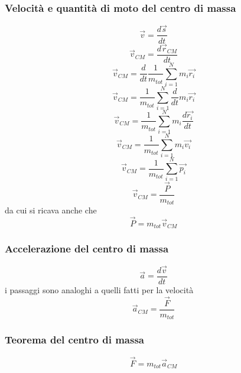 \documentclass[twoside]{article}
\begin{document}
\subsubsection{Velocità e quantità di moto del centro di massa}
\begin{equation*}
  \vec{v} = \frac{d \vec{s}}{dt}
\end{equation*}
\begin{equation*}
  \vec{v}_{CM} = \frac{d \vec{r}_{CM}}{dt}
\end{equation*}
\begin{equation*}
  \vec{v}_{CM} = \frac{d}{dt} \frac{1}{m_{tot}} \sum_{i=1}^{N} m_i \vec{r_i}
\end{equation*}
\begin{equation*}
  \vec{v}_{CM} = \frac{1}{m_{tot}} \sum_{i=1}^{N} \frac{d}{dt}m_i \vec{r_i}
\end{equation*}
\begin{equation*}
  \vec{v}_{CM} = \frac{1}{m_{tot}} \sum_{i=1}^{N} m_i \frac{d\vec{r_i}}{dt}
\end{equation*}
\begin{equation*}
  \vec{v}_{CM} = \frac{1}{m_{tot}} \sum_{i=1}^{N} m_i \vec{v_i}
\end{equation*}
\begin{equation*}
  \vec{v}_{CM} = \frac{1}{m_{tot}} \sum_{i=1}^{N} \vec{p_i}
\end{equation*}
\begin{equation}
  \boxed{\vec{v}_{CM} = \frac{\vec{P}}{m_{tot}}}
\end{equation}
da cui si ricava anche che
\begin{equation}
  \boxed{\vec{P} = m_{tot} \vec{v}_{CM}}
\end{equation}
\subsubsection{Accelerazione del centro di massa}
\begin{equation*}
  \vec{a} = \frac{d \vec{v}}{dt}
\end{equation*}
i passaggi sono analoghi a quelli fatti per la velocità
\begin{equation}
  \boxed{\vec{a}_{CM} = \frac{\vec{F}}{m_{tot}}}
\end{equation}
\subsubsection{Teorema del centro di massa}
\begin{equation}
  \boxed{\vec{F} = m_{tot} \vec{a}_{CM}}
\end{equation}
\end{document}
